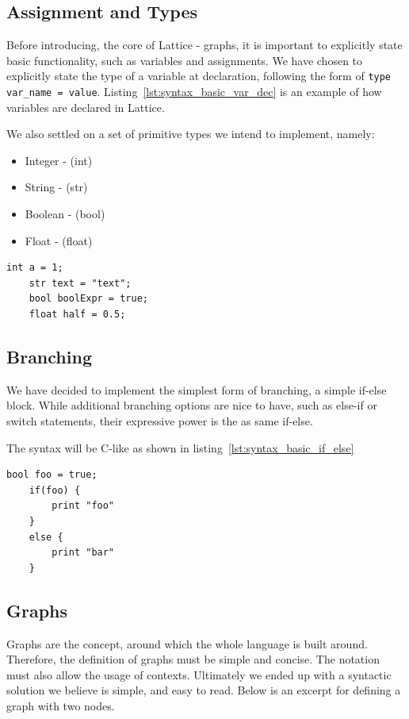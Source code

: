 \subsection{Assignment and Types}\label{subsec:syntax_assignment_and_types}
Before introducing, the core of Lattice - graphs, it is important to explicitly state basic functionality,
such as variables and assignments.
We have chosen to explicitly state the type of a variable at declaration,
following the form of \lstinline{type var_name = value}.
Listing~\ref{lst:syntax_basic_var_dec} is an example of how variables are declared in Lattice.

We also settled on a set of primitive types we intend to implement, namely:
\begin{itemize}
    \item Integer - (int)
    \item String - (str)
    \item Boolean - (bool)
    \item Float - (float)
\end{itemize}

\begin{lstlisting}[caption={Basic variable declaration.},captionpos=b,label={lst:syntax_basic_var_dec}]
    int a = 1;
    str text = "text";
    bool boolExpr = true;
    float half = 0.5;
\end{lstlisting}



\subsection{Branching}\label{subsec:syntax_branching}
We have decided to implement the simplest form of branching, a simple if-else block.
While additional branching options are nice to have, such as else-if or switch statements, their
expressive power is the as same if-else.

The syntax will be C-like as shown in listing~\ref{lst:syntax_basic_if_else}
\begin{lstlisting}[caption={Simple branching example.},captionpos=b,label={lst:syntax_basic_if_else}]
    bool foo = true;
    if(foo) {
        print "foo"
    }
    else {
        print "bar"
    }
\end{lstlisting}

\subsection{Graphs}\label{subsec:syntax_graphs}
Graphs are the concept, around which the whole language is built around.
Therefore, the definition of graphs
must be simple and concise.
The notation must also allow the usage of contexts.
Ultimately we ended up with a syntactic solution we believe is simple, and easy to read.
Below is an excerpt for
defining a graph with two nodes.

